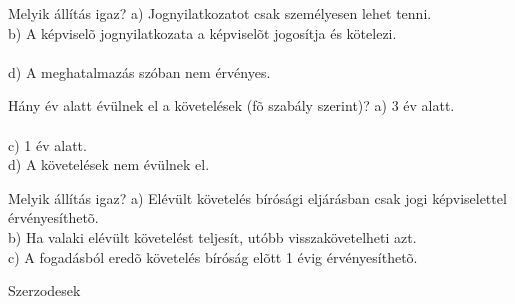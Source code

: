 \begin{frame}

\begin{tcolorbox}[title={145. Kérdés}]
Melyik állítás igaz?
\tcblower
a) Jognyilatkozatot csak személyesen lehet tenni.\\
b) A képviselõ jognyilatkozata a képviselõt jogosítja és kötelezi.\\
\\
d) A meghatalmazás szóban nem érvényes.
\end{tcolorbox}

\begin{tcolorbox}[title={146. Kérdés}]
Hány év alatt évülnek el a követelések (fõ szabály szerint)?
\tcblower
a) 3 év alatt.\\
\\
c) 1 év alatt.\\
d) A követelések nem évülnek el.
\end{tcolorbox}

\begin{tcolorbox}[title={147. Kérdés}]
Melyik állítás igaz?
\tcblower
a) Elévült követelés bírósági eljárásban csak jogi képviselettel érvényesíthetõ.\\
b) Ha valaki elévült követelést teljesít, utóbb visszakövetelheti azt.\\
c) A fogadásból eredõ követelés bíróság elõtt 1 évig érvényesíthetõ.\\
\end{tcolorbox}

\end{frame}

\begin{frame}[plain]
\begin{tcolorbox}[center, colback={myyellow}, coltext={black}, colframe={myyellow}]
    { Szerzodesek}\\
\end{tcolorbox}
\end{frame}

